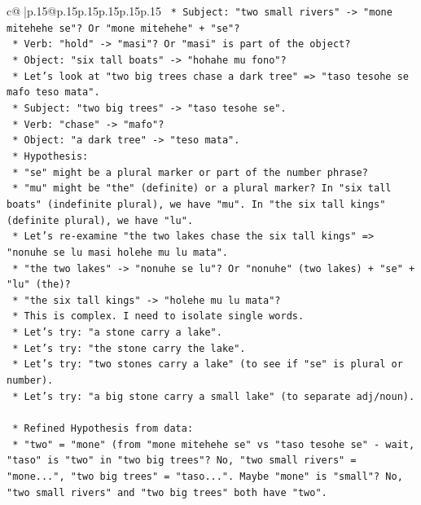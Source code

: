 \documentclass{article}
\begin{document}
{\begin{supertabular}{c@{$\;$}|p{.15\linewidth}@{}p{.15\linewidth}p{.15\linewidth}p{.15\linewidth}p{.15\linewidth}p{.15\linewidth}}
{{{\texttt{        *   Subject: "two small rivers" {-}> "mone mitehehe se"? Or "mone mitehehe" + "se"?} \\
\texttt{        *   Verb: "hold" {-}> "masi"? Or "masi" is part of the object?} \\
\texttt{        *   Object: "six tall boats" {-}> "hohahe mu fono"?} \\
\texttt{    *   Let's look at "two big trees chase a dark tree" => "taso tesohe se mafo teso mata".} \\
\texttt{        *   Subject: "two big trees" {-}> "taso tesohe se".} \\
\texttt{        *   Verb: "chase" {-}> "mafo"?} \\
\texttt{        *   Object: "a dark tree" {-}> "teso mata".} \\
\texttt{    *   Hypothesis:} \\
\texttt{        *   "se" might be a plural marker or part of the number phrase?} \\
\texttt{        *   "mu" might be "the" (definite) or a plural marker? In "six tall boats" (indefinite plural), we have "mu". In "the six tall kings" (definite plural), we have "lu".} \\
\texttt{        *   Let's re{-}examine "the two lakes chase the six tall kings" => "nonuhe se lu masi holehe mu lu mata".} \\
\texttt{            *   "the two lakes" {-}> "nonuhe se lu"? Or "nonuhe" (two lakes) + "se" + "lu" (the)?} \\
\texttt{            *   "the six tall kings" {-}> "holehe mu lu mata"?} \\
\texttt{    *   This is complex. I need to isolate single words.} \\
\texttt{    *   Let's try: "a stone carry a lake".} \\
\texttt{    *   Let's try: "the stone carry the lake".} \\
\texttt{    *   Let's try: "two stones carry a lake" (to see if "se" is plural or number).} \\
\texttt{    *   Let's try: "a big stone carry a small lake" (to separate adj/noun).} \\
\\ 
\texttt{    *   Refined Hypothesis from data:} \\
\texttt{        *   "two" = "mone" (from "mone mitehehe se" vs "taso tesohe se" {-} wait, "taso" is "two" in "two big trees"? No, "two small rivers" = "mone...", "two big trees" = "taso...". Maybe "mone" is "small"? No, "two small rivers" and "two big trees" both have "two".} \\
}}}
\end{supertabular}}
\end{document}
